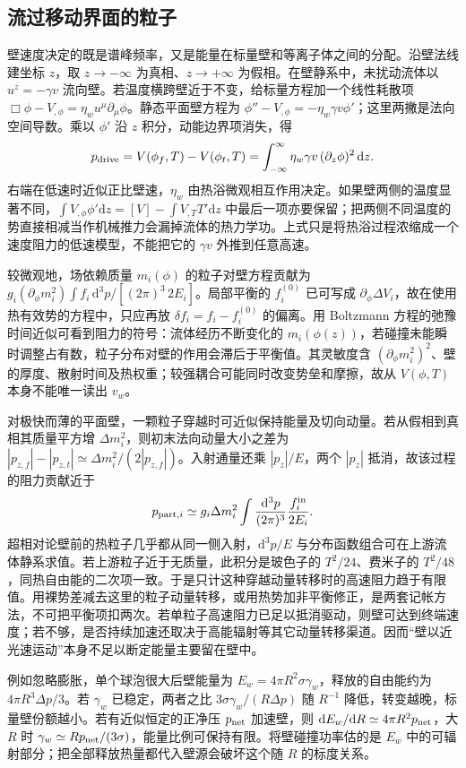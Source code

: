 \subsection{流过移动界面的粒子}

壁速度决定的既是谱峰频率，又是能量在标量壁和等离子体之间的分配。沿壁法线建坐标 $z$，取 $z\to-\infty$ 为真相、$z\to+\infty$ 为假相。在壁静系中，未扰动流体以 $u^z=-\gamma v$ 流向壁。若温度横跨壁近于不变，给标量方程加一个线性耗散项 $\Box\phi-V_{,\phi}=\eta_w u^\mu\partial_\mu\phi$。静态平面壁方程为 $\phi''-V_{,\phi}=-\eta_w\gamma v\phi'$；这里两撇是法向空间导数。乘以 $\phi'$ 沿 $z$ 积分，动能边界项消失，得
\[
 p_{\rm drive}=V(\phi_f,T)-V(\phi_t,T)
 =\int_{-\infty}^{\infty}\eta_w\gamma v\,(\partial_z\phi)^2\,\mathrm dz .
\]
右端在低速时近似正比壁速，$\eta_w$ 由热浴微观相互作用决定。如果壁两侧的温度显著不同，$\int V_{,\phi}\phi'\mathrm dz=[V]-\int V_{,T}T'\mathrm dz$ 中最后一项亦要保留；把两侧不同温度的势直接相减当作机械推力会漏掉流体的热力学功。上式只是将热浴过程浓缩成一个速度阻力的低速模型，不能把它的 $\gamma v$ 外推到任意高速。

较微观地，场依赖质量 $m_i(\phi)$ 的粒子对壁方程贡献为 $g_i(\partial_\phi m_i^2)\int f_i\,\mathrm d^3p/[(2\pi)^3\,2E_i]$。局部平衡的 $f_i^{(0)}$ 已可写成 $\partial_\phi\Delta V_i$，故在使用热有效势的方程中，只应再放 $\delta f_i=f_i-f_i^{(0)}$ 的偏离。用 Boltzmann 方程的弛豫时间近似可看到阻力的符号：流体经历不断变化的 $m_i(\phi(z))$，若碰撞未能瞬时调整占有数，粒子分布对壁的作用会滞后于平衡值。其灵敏度含 $(\partial_\phi m_i^2)^2$、壁的厚度、散射时间及热权重；较强耦合可能同时改变势垒和摩擦，故从 $V(\phi,T)$ 本身不能唯一读出 $v_w$。

对极快而薄的平面壁，一颗粒子穿越时可近似保持能量及切向动量。若从假相到真相其质量平方增 $\Delta m_i^2$，则初末法向动量大小之差为 $|p_{z,f}|-|p_{z,t}|\simeq\Delta m_i^2/(2|p_{z,f}|)$。入射通量还乘 $|p_z|/E$，两个 $|p_z|$ 抵消，故该过程的阻力贡献近于
\[
 p_{{\rm part},i}\simeq g_i\Delta m_i^2
      \int\frac{\mathrm d^3p}{(2\pi)^3}\frac{f_i^{\rm in}}{2E_i}.
\]
超相对论壁前的热粒子几乎都从同一侧入射，$\mathrm d^3p/E$ 与分布函数组合可在上游流体静系求值。若上游粒子近于无质量，此积分是玻色子的 $T^2/24$、费米子的 $T^2/48$，同热自由能的二次项一致。于是只计这种穿越动量转移时的高速阻力趋于有限值。用裸势差减去这里的粒子动量转移，或用热势加非平衡修正，是两套记帐方法，不可把平衡项扣两次。若单粒子高速阻力已足以抵消驱动，则壁可达到终端速度；若不够，是否持续加速还取决于高能辐射等其它动量转移渠道。因而“壁以近光速运动”本身不足以断定能量主要留在壁中。

例如忽略膨胀，单个球泡很大后壁能量为 $E_w=4\pi R^2\sigma\gamma_w$，释放的自由能约为 $4\pi R^3\Delta p/3$。若 $\gamma_w$ 已稳定，两者之比 $3\sigma\gamma_w/(R\Delta p)$ 随 $R^{-1}$ 降低，转变越晚，标量壁份额越小。若有近似恒定的正净压 $p_{\rm net}$ 加速壁，则 $\mathrm dE_w/\mathrm dR\simeq4\pi R^2p_{\rm net}$，大 $R$ 时 $\gamma_w\simeq R p_{\rm net}/(3\sigma)$，能量比例可保持有限。将壁碰撞功率估的是 $E_w$ 中的可辐射部分；把全部释放热量都代入壁源会破坏这个随 $R$ 的标度关系。

